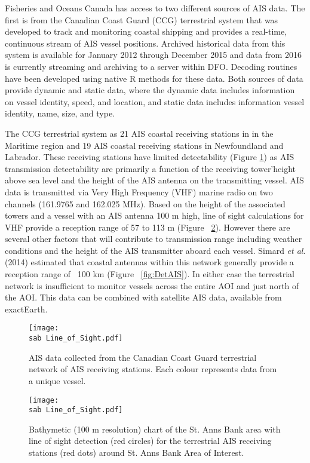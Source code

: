 \documentclass[letterpaper,portrait,11pt]{scrartcl}
\numberwithin{equation}{section}		%
\numberwithin{figure}{section}			%
\numberwithin{table}{section}				%
\newcommand{\ecomod}{\string~/ecomod_data/}   %
\newcommand{\sab}{\ecomod/mpa/sab/}   %
\begin{document}
\begin{itemize*}
Fisheries and Oceans Canada has access to two different sources of AIS data.  The first is from the Canadian Coast Guard (CCG) terrestrial system that was developed to track and monitoring coastal shipping and provides a real-time, continuous stream of AIS vessel positions.  Archived historical data from this system is available for January 2012 through December 2015 and data from 2016 is currently streaming and archiving to a server within DFO. Decoding routines have been developed using native R methods for these data.   Both sources of data provide dynamic and static data, where the dynamic data includes information on vessel identity, speed, and location, and static data includes information vessel identity, name, size, and type.   

The CCG terrestrial system as 21 AIS coastal receiving stations in in the Maritime region and 19 AIS coastal receiving stations in Newfoundland and Labrador.  These receiving stations have limited detectability (Figure \ref{fig:TAIS}) as AIS transmission detectability are primarily a function of the receiving tower\textquoteright height above sea level and the height of the AIS antenna on the transmitting vessel.  AIS data is transmitted via Very High Frequency (VHF) marine radio on two channels (161.9765 and 162.025 MHz).  Based on the height of the associated towers and a vessel with an AIS antenna 100 m high, line of sight calculations for VHF provide a reception range of  57 to 113 m (Figure ~\ref{fig:LOF}).  However there are several other factors that will contribute to transmission range including weather conditions and the height of the AIS transmitter aboard each vessel.  Simard \textit{et al}. (2014) estimated that coastal antennas within this network generally provide a reception range of ~100 km (Figure ~\ref{fig:DetAIS}).  In either case the terrestrial network is insufficient to monitor vessels across the entire AOI and just north of the AOI. This data can be combined with satellite AIS data, available from exactEarth.


\begin{figure}[h]
	\centering
	\texttt{[image: \\sab Line\_of\_Sight.pdf]}
	\caption{AIS data collected from the Canadian Coast Guard terrestrial network of AIS receiving stations.  Each colour represents data from a unique vessel.}
	\label{fig:TAIS}
\end{figure}


\begin{figure}[h]
	\centering
	\texttt{[image: \\sab Line\_of\_Sight.pdf]}
	\caption{Bathymetic (100 m resolution) chart of the  St. Anns Bank area with line of sight detection (red circles) for the terrestrial AIS receiving stations (red dots) around St. Anns Bank Area of Interest.}
	\label{fig:LOF}
\end{figure}


\end{itemize*}
\end{document}
